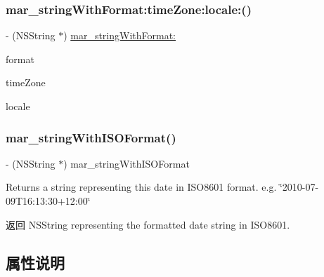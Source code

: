 \subsubsection{\texorpdfstring{mar\+\_\+string\+With\+Format\+:time\+Zone\+:locale\+:()}{mar\_stringWithFormat:timeZone:locale:()}\hspace{0.1cm}{\footnotesize\ttfamily [2/2]}}
{\footnotesize\ttfamily -\/ (N\+S\+String $\ast$) \hyperlink{category_n_s_date_07_m_a_r_e_x_08_abc31fcbf1979057b8298058d237c793a}{mar\+\_\+string\+With\+Format\+:} \begin{DoxyParamCaption}\item[{(N\+S\+String $\ast$)}]{format }\item[{timeZone:(N\+S\+Time\+Zone $\ast$)}]{time\+Zone }\item[{locale:(N\+S\+Locale $\ast$)}]{locale }\end{DoxyParamCaption}\hspace{0.3cm}{\ttfamily [implementation]}}

\mbox{\label{category_n_s_date_07_m_a_r_e_x_08_a14bde423f52e4a860aa746fa22f51023}} 
\subsubsection{\texorpdfstring{mar\+\_\+string\+With\+I\+S\+O\+Format()}{mar\_stringWithISOFormat()}}
{\footnotesize\ttfamily -\/ (N\+S\+String $\ast$) mar\+\_\+string\+With\+I\+S\+O\+Format \begin{DoxyParamCaption}{ }\end{DoxyParamCaption}}

Returns a string representing this date in I\+S\+O8601 format. e.\+g. \char`\"{}2010-\/07-\/09\+T16\+:13\+:30+12\+:00\char`\"{}

\begin{DoxyReturn}{返回}
N\+S\+String representing the formatted date string in I\+S\+O8601. 
\end{DoxyReturn}


\subsection{属性说明}
\mbox{\label{category_n_s_date_07_m_a_r_e_x_08_a14a74fc02f2557fa6082ae5ae2c752eb}} 
